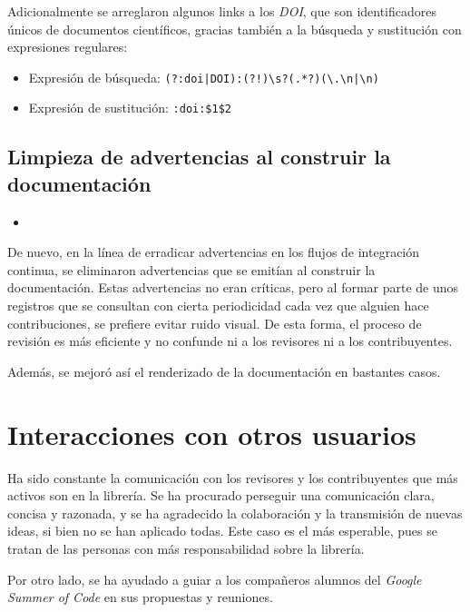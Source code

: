 Adicionalmente se arreglaron algunos links a los \textit{DOI}, que son identificadores únicos de documentos científicos, gracias también a la búsqueda y sustitución con expresiones regulares:

\begin{itemize}
    \item Expresión de búsqueda: \texttt{(?:doi|DOI):(?!\textasciigrave{})\textbackslash s?(.*?)(\textbackslash .\textbackslash n|\textbackslash n)}
\end{itemize}
\begin{itemize}
    \item Expresión de sustitución: \texttt{:doi:\textasciigrave{}\$1\textasciigrave{}\$2}
\end{itemize}

\subsection{Limpieza de advertencias al construir la documentación}

\begin{itemize}
    \item {}
\end{itemize}

De nuevo, en la línea de erradicar advertencias en los flujos de integración continua, se eliminaron advertencias que se emitían al construir la documentación. Estas advertencias no eran críticas, pero al formar parte de unos registros que se consultan con cierta periodicidad cada vez que alguien hace contribuciones, se prefiere evitar ruido visual. De esta forma, el proceso de revisión es más eficiente y no confunde ni a los revisores ni a los contribuyentes.

Además, se mejoró así el renderizado de la documentación en bastantes casos.

\section{Interacciones con otros usuarios}

Ha sido constante la comunicación con los revisores y los contribuyentes que más activos son en la librería. Se ha procurado perseguir una comunicación clara, concisa y razonada, y se ha agradecido la colaboración y la transmisión de nuevas ideas, si bien no se han aplicado todas. Este caso es el más esperable, pues se tratan de las personas con más responsabilidad sobre la librería.

Por otro lado, se ha ayudado a guiar a los compañeros alumnos del \textit{Google Summer of Code} en sus propuestas y reuniones.

